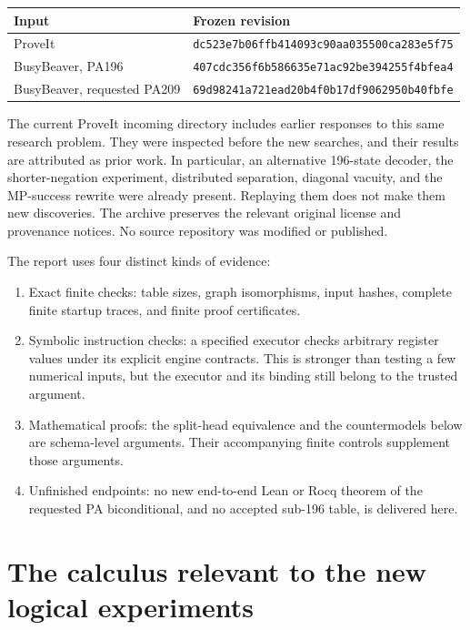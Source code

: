 \documentclass[11pt,letterpaper]{article}
\newcommand{\file}[1]{\texttt{\nolinkurl{#1}}}
\begin{document}
\begin{center}\small
\begin{tabular}{@{}ll@{}}
\toprule
Input & Frozen revision\\
\midrule
ProveIt & \file{dc523e7b06ffb414093c90aa035500ca283e5f75}\\
BusyBeaver, PA196 & \file{407cdc356f6b586635e71ac92be394255f4bfea4}\\
BusyBeaver, requested PA209 & \file{69d98241a721ead20b4f0b17df9062950b40fbfe}\\
\bottomrule
\end{tabular}
\end{center}

The current ProveIt incoming directory includes earlier responses to
this same research problem. They were inspected before the new searches,
and their results are attributed as prior work. In particular, an
alternative 196-state decoder, the shorter-negation experiment,
distributed separation, diagonal vacuity, and the MP-success rewrite
were already present. Replaying them does not make them new discoveries.
The archive preserves the relevant original license and provenance
notices. No source repository was modified or published.

The report uses four distinct kinds of evidence:
\begin{enumerate}
\item Exact finite checks: table sizes, graph isomorphisms, input hashes,
      complete finite startup traces, and finite proof certificates.
\item Symbolic instruction checks: a specified executor checks arbitrary
      register values under its explicit engine contracts. This is
      stronger than testing a few numerical inputs, but the executor and
      its binding still belong to the trusted argument.
\item Mathematical proofs: the split-head equivalence and the
      countermodels below are schema-level arguments. Their accompanying
      finite controls supplement those arguments.
\item Unfinished endpoints: no new end-to-end Lean or Rocq theorem of
      the requested PA biconditional, and no accepted sub-196 table, is
      delivered here.
\end{enumerate}



\section{The calculus relevant to the new logical experiments}
\end{document}
